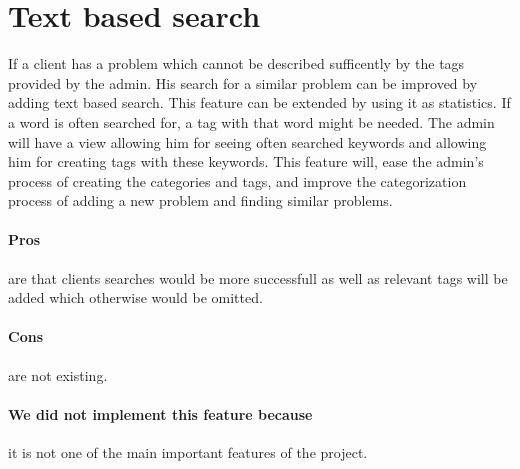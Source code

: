 \section{Text based search}
\label{sec:text_based_search}
If a client has a problem which cannot be described sufficently by the tags provided by the admin. 
His search for a similar problem can be improved by adding text based search. 
This feature can be extended by using it as statistics. If a word is often searched for, a tag with that word might be needed. 
The admin will have a view allowing him for seeing often searched keywords and allowing him for creating tags with these keywords.
This feature will, ease the admin's process of creating the categories and tags, and improve the categorization process of adding a new problem and finding similar problems.

\paragraph{Pros} are that clients searches would be more successfull as well as relevant tags will be added which otherwise would be omitted.
\paragraph{Cons} are not existing.
\paragraph{We did not implement this feature because} it is not one of the main important features of the project. 